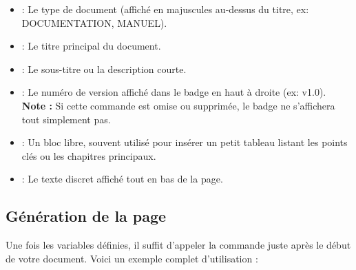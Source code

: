 \begin{itemize}
    \item {} : Le type de document (affiché en majuscules au-dessus du titre, ex: DOCUMENTATION, MANUEL).
    \item {} : Le titre principal du document.
    \item {} : Le sous-titre ou la description courte.
    \item {} : Le numéro de version affiché dans le badge en haut à droite (ex: v1.0). \textbf{Note :} Si cette commande est omise ou supprimée, le badge ne s'affichera tout simplement pas.
    \item {} : Un bloc libre, souvent utilisé pour insérer un petit tableau listant les points clés ou les chapitres principaux.
    \item {} : Le texte discret affiché tout en bas de la page.
\end{itemize}

\subsection{Génération de la page}

Une fois les variables définies, il suffit d'appeler la commande  juste après le début de votre document. Voici un exemple complet d'utilisation :

